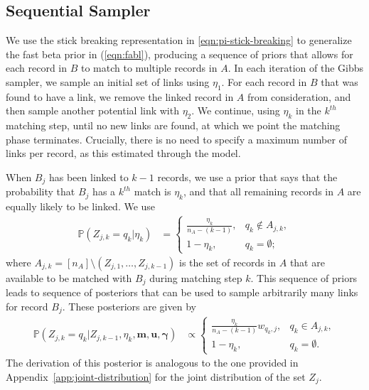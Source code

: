 \documentclass[12pt,letterpaper]{article}
\newcommand{\1}[1]{\mathbb{I}\!\left[#1\right]} %
\def \brian#1{{\color{red} (#1)}}
\begin{document}

\subsection{Sequential Sampler} \label{sec:sequential-sampler} 

We use the stick breaking representation in \eqref{eqn:pi-stick-breaking} to generalize the fast beta prior in (\ref{eqn:fabl}), producing a sequence of priors that allows for each record in $B$ to match to multiple records in $A$. In each iteration of the Gibbs sampler, we sample an initial set of links using $\eta_1$. For each record in $B$ that was found to have a link, we remove the linked record in $A$ from consideration, and then sample another potential link with $\eta_2$. We continue, using $\eta_k$ in the $k^{th}$ matching step, until no new links are found, at which we point the matching phase terminates. Crucially, there is no need to specify a maximum number of links per record, as this estimated through the model. 

When $B_j$ has been linked to $k-1$ records, we use a prior that says that the probability that $B_j$ has a $k^{th}$ match is $\eta_k$, and that all remaining records in $A$ are equally likely to be linked. We use
\begin{align} \label{eqn:sequential_prior}
	\mathbb{P}(Z_{j, k} = q_k|\eta_k) &= \begin{cases}
		\frac{\eta_k}{n_A - (k - 1)}, &  q_k \notin A_{j, k}, \\
		1 - \eta_k, & q_k = \emptyset;
	\end{cases}
\end{align}
where $A_{j, k} = [n_A] \setminus (Z_{j, 1}, \ldots, Z_{j, k-1})$ is the set of records in $A$ that are available to be matched with $B_j$ during matching step $k$. This sequence of priors leads to sequence of posteriors that can be used to sample arbitrarily many links for record $B_j$. These posteriors are given by 
\begin{align} \label{eqn:sequential_posterior}
	\mathbb{P}(Z_{j, k} = q_k|Z_{j, k-1}, \eta_k, \bm{m}, \bm{u}, \bm{\gamma}) &\propto \begin{cases}
		\frac{\eta_k}{n_A - (k - 1)} w_{q_k, j}, & q_k \in A_{j, k}, \\
		1 - \eta_k, & q_k= \emptyset.
	\end{cases}
\end{align}
The derivation of this posterior is analogous to the one provided in Appendix~\ref{app:joint-distribution} for the joint distribution of the set $Z_j$.
\end{document}
